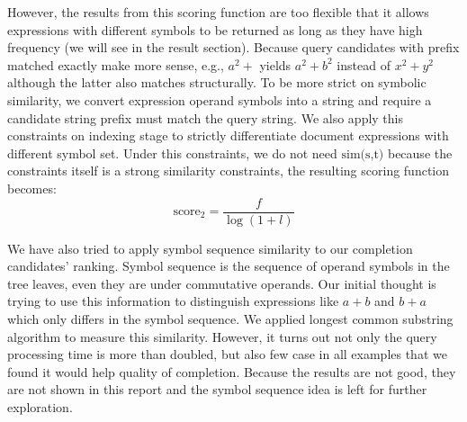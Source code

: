 \documentclass[12pt]{article} %
\begin{document}
However, the results from this scoring function are too flexible that it allows expressions with different symbols to be returned as long as they have high frequency (we will see in the result section).
Because query candidates with prefix matched exactly make more sense, e.g., $a^2 + $ yields $a^2 + b^2 $ instead of $x^2 + y^2$ although the latter also matches structurally. 
To be more strict on symbolic similarity, we convert expression operand symbols into a string and require a candidate string prefix must match the query string.
We also apply this constraints on indexing stage to strictly differentiate document expressions with different symbol set.
Under this constraints, we do not need $\text{sim(s,t)}$ because the constraints itself is a strong similarity constraints, the resulting scoring function becomes:
$$
\text{score}_2 = \frac{f}{\log(1 + l)}
$$

We have also tried to apply symbol sequence similarity to our completion candidates' ranking.
Symbol sequence is the sequence of operand symbols in the tree leaves, even they are under
commutative operands. Our initial thought is trying to use this information to distinguish
expressions like $a + b$ and $b + a$ which only differs in the symbol sequence.
We applied longest common substring algorithm to measure this similarity.
However, it turns out not only the query processing time is more than doubled, but also 
few case in all examples that we found it would help quality of completion.
Because the results are not good, they are not shown in this report and the symbol sequence idea
is left for further exploration.
\end{document}
